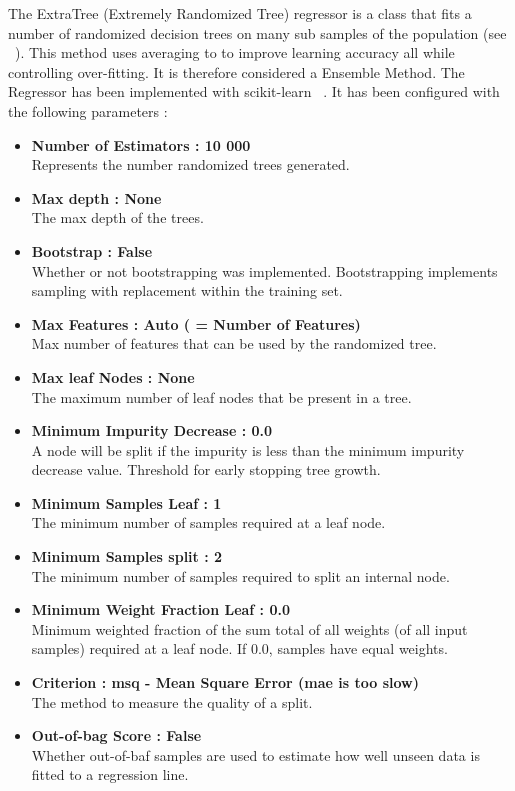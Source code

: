 \documentclass[a4paper,11pt]{report}
\numberwithin{figure}{section} %
\begin{document}
    The ExtraTree (Extremely Randomized Tree) regressor is a class that fits a number of randomized decision trees on many sub samples of the population (see ~\cite{extratree}).
    This method uses averaging to to improve learning accuracy all while controlling over-fitting.
    It is therefore considered a Ensemble Method.
    The Regressor has been implemented with scikit-learn ~\cite{scikit-learn}.
    It has been configured with the following parameters :
    \begin{itemize}
        \item[\textbullet] \textbf{Number of Estimators : 10 000}\\
        Represents the number randomized trees generated.
        \item[\textbullet] \textbf{Max depth : None}\\
        The max depth of the trees.
        \item[\textbullet] \textbf{Bootstrap : False}\\
        Whether or not bootstrapping was implemented.
        Bootstrapping implements sampling with replacement within the training set.
        \item[\textbullet] \textbf{Max Features : Auto ( = Number of Features)}\\
        Max number of features that can be used by the randomized tree.
        \item[\textbullet] \textbf{Max leaf Nodes : None}\\
        The maximum number of leaf nodes that be present in a tree.
        \item[\textbullet] \textbf{Minimum Impurity Decrease : 0.0}\\
        A node will be split if the impurity is less than the minimum impurity decrease value.
        Threshold for early stopping tree growth.
        \item[\textbullet] \textbf{Minimum Samples Leaf : 1}\\
        The minimum number of samples required at a leaf node.
        \item[\textbullet] \textbf{Minimum Samples split : 2}\\
        The minimum number of samples required to split an internal node.
        \item[\textbullet] \textbf{Minimum Weight Fraction Leaf : 0.0}\\
        Minimum weighted fraction of the sum total of all weights (of all input samples) required at a leaf node.
        If 0.0, samples have equal weights.
        \item[\textbullet] \textbf{Criterion : msq - Mean Square Error (mae is too slow)}\\
        The method to measure the quality of a split.
        \item[\textbullet] \textbf{Out-of-bag Score : False}\\
        Whether out-of-baf samples are used to estimate how well unseen data is fitted to a regression line.
    \end{itemize}
\end{document}
